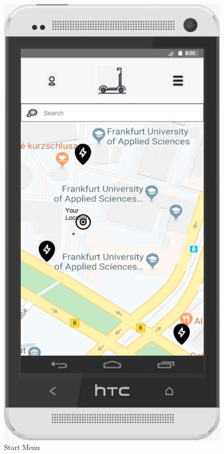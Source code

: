 \documentclass[a4paper, 12pt]{article}
\begin{document}
\begin{figure} [htbp]
  \begin{center}
    \includegraphics[scale=0.6]{02-start-menu.png}
  \end{center}
  \caption{Start Menu}
\end{figure}
\end{document}
